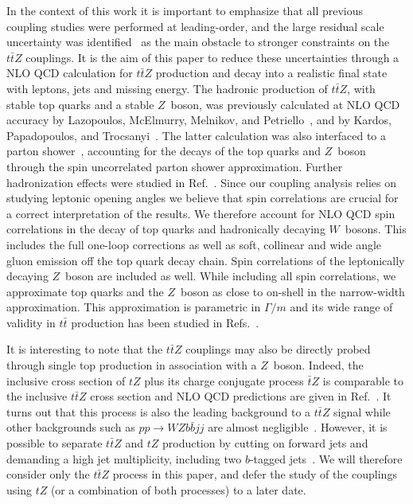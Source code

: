 \documentclass{JHEP3}
\def\ttbZ{t\bar{t}Z}
\def\ttb{t\bar{t}}
\begin{document}
In the context of this work it is important to emphasize that all previous coupling studies were performed at leading-order, and the large residual scale uncertainty 
was identified~\cite{Baur:2004uw} as the main obstacle to stronger constraints on the $\ttbZ$ couplings.
It is the aim of this paper to reduce these uncertainties through a NLO QCD calculation for $\ttbZ$ production and decay into a realistic final state with leptons, jets and missing energy.
The hadronic production of $\ttbZ$, with stable top quarks and a stable $Z$~boson, was previously calculated at NLO QCD accuracy by 
Lazopoulos, McElmurry, Melnikov, and Petriello~\cite{Lazopoulos:2008de}, and  by Kardos, Papadopoulos, and Trocsanyi~\cite{Kardos:2011na}.
The latter calculation was also interfaced to a parton shower~\cite{Garzelli:2011is}, accounting for the decays of the top quarks and $Z$~boson through 
the spin uncorrelated parton shower approximation.
Further hadronization effects were studied in Ref.~\cite{Garzelli:2012bn}.
Since our coupling analysis relies on studying leptonic opening angles we believe that spin correlations are crucial for a correct interpretation of the results.
We therefore account for NLO QCD spin correlations in the decay of top quarks and hadronically decaying $W$~bosons.
This includes the full one-loop corrections as well as soft, collinear and wide angle gluon emission off the top quark decay chain.
Spin correlations of the leptonically decaying $Z$~boson are included as well.
While including all spin correlations, we approximate top quarks and the $Z$~boson as close to on-shell in the narrow-width approximation.
This approximation is parametric in $\Gamma/m$ and its wide range of validity in $\ttb$ production has been studied in Refs.~\cite{Buttar:2008jx,Denner:2012yc,Bevilacqua:2010qb,Heinrich:2013qaa}.

It is interesting to note that the $\ttbZ$ couplings may also be directly probed through single top production in association with a $Z$~boson. 
Indeed, the inclusive cross section of $tZ$ plus its charge conjugate process $\bar{t}Z$ is comparable to the inclusive $\ttbZ$ cross section 
and NLO QCD predictions are given in Ref.~\cite{Campbell:2013yla}. 
It turns out that this process is also the leading background to a $\ttbZ$ signal while other backgrounds such as $pp\to WZ b \bar{b} jj$ are almost negligible~\cite{Baur:2004uw}.
However, it is possible to separate $\ttbZ$ and $tZ$ production by cutting on forward jets and demanding a high jet multiplicity, including two $b$-tagged jets~\cite{Campbell:2013yla}. 
We will therefore consider only the $\ttbZ$ process in this paper, and defer the study of the couplings using $tZ$ (or a combination of both processes) to a later date. 
\end{document}
